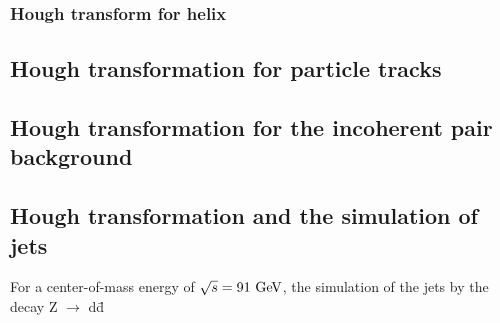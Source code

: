 \subsubsection{Hough transform for helix}

\subsection{Hough transformation for particle tracks}
\subsection{Hough transformation for the incoherent pair background}
\subsection{Hough transformation and the simulation of jets}

For a center-of-mass energy of $\sqrt{s} = 91 \,\mathrm{\,Ge\kern -0.1em V}$, the simulation of the jets by the decay Z $\rightarrow$ d\={d}

